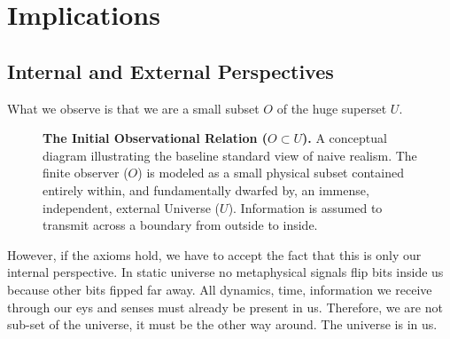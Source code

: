 \chapter{Implications}
\label{chap:implications}


\section{Internal and External Perspectives}

What we observe is that we are a small subset $O$ of  the huge superset $U$.

\begin{figure}[htbp]
\centering
{}
\caption{\textbf{The Initial Observational Relation ($O \subset U$).} A conceptual diagram illustrating the baseline standard view of naive realism. The finite observer ($O$) is modeled as a small physical subset contained entirely within, and fundamentally dwarfed by, an immense, independent, external Universe ($U$). Information is assumed to transmit across a boundary from outside to inside.}
\label{fig:diag1}
\end{figure}

\newpage

However, if the axioms hold, we have to accept the fact that this is
only our internal perspective. In static universe no metaphysical
signals flip bits inside us because other bits fipped far away.
All dynamics, time, information we receive through our eys and senses
must already be present in us. Therefore, we are not sub-set
of the universe, it must be the other way around. The universe is in us. 


